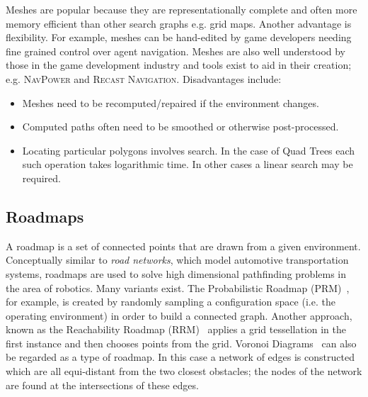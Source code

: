 Meshes are popular because they are representationally complete and often more
memory efficient than other search graphs e.g. grid maps. Another advantage is
flexibility. For example, meshes can be hand-edited by game developers needing
fine grained control over agent navigation. Meshes are also well understood by 
those in the game development industry and tools exist to aid in their creation; 
e.g. \textsc{NavPower} and \textsc{Recast Navigation}. Disadvantages include: 
\begin{itemize}
\item Meshes need to be recomputed/repaired if the environment changes.
\item Computed paths often need to be smoothed or otherwise post-processed.
\item Locating particular polygons involves search. In the case 
of Quad Trees each such operation takes logarithmic time. In other cases
a linear search may be required.
\end{itemize}


\subsection{Roadmaps}
\label{cha::lit::graphs::road}
A roadmap is a set of connected points that are drawn from a given environment.
Conceptually similar to \emph{road networks}, which model automotive
transportation systems, roadmaps are used to solve high dimensional pathfinding
problems in the area of robotics.  Many variants exist. The Probabilistic
Roadmap (PRM)~\citep{kavraki94}, for example,
 is created by randomly sampling a configuration space (i.e. the operating environment) in
order to build a connected graph. Another approach, known as the Reachability
Roadmap (RRM)~\citep{geraerts05} applies a grid tessellation in the first
instance and then chooses points from the grid.  Voronoi Diagrams~\citep{aurenhammer91}
can also be regarded as a type of roadmap. In this case a network of edges is constructed
which are all equi-distant from the two closest obstacles; the nodes of the network are 
found at the intersections of these edges.


